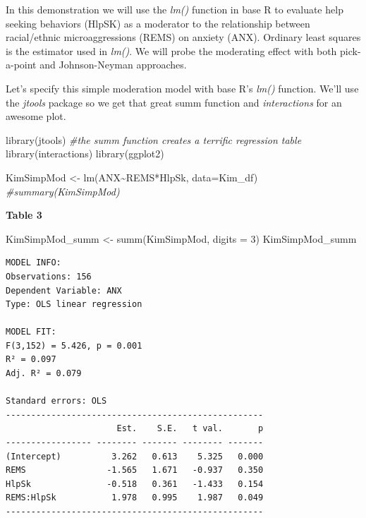 \documentclass[
  11pt,
]{book}
\newenvironment{Shaded}{\begin{snugshade}}{\end{snugshade}}
\newcommand{\AttributeTok}[1]{\textcolor[rgb]{0.77,0.63,0.00}{#1}}
\newcommand{\CommentTok}[1]{\textcolor[rgb]{0.56,0.35,0.01}{\textit{#1}}}
\newcommand{\DecValTok}[1]{\textcolor[rgb]{0.00,0.00,0.81}{#1}}
\newcommand{\FunctionTok}[1]{\textcolor[rgb]{0.00,0.00,0.00}{#1}}
\newcommand{\NormalTok}[1]{#1}
\newcommand{\OtherTok}[1]{\textcolor[rgb]{0.56,0.35,0.01}{#1}}
\newcommand{\SpecialCharTok}[1]{\textcolor[rgb]{0.00,0.00,0.00}{#1}}
\begin{document}
In this demonstration we will use the \emph{lm()} function in base R to evaluate help seeking behaviors (HlpSK) as a moderator to the relationship between racial/ethnic microaggressions (REMS) on anxiety (ANX). Ordinary least squares is the estimator used in \emph{lm()}. We will probe the moderating effect with both pick-a-point and Johnson-Neyman approaches.

Let's specify this simple moderation model with base R's \emph{lm()} function. We'll use the \emph{jtools} package so we get that great summ function and \emph{interactions} for an awesome plot.

\begin{Shaded}
\begin{Highlighting}[]
\FunctionTok{library}\NormalTok{(jtools) }\CommentTok{\#the summ function creates a terrific regression table}
\FunctionTok{library}\NormalTok{(interactions)}
\FunctionTok{library}\NormalTok{(ggplot2)}

\NormalTok{KimSimpMod }\OtherTok{\textless{}{-}} \FunctionTok{lm}\NormalTok{(ANX}\SpecialCharTok{\textasciitilde{}}\NormalTok{REMS}\SpecialCharTok{*}\NormalTok{HlpSk, }\AttributeTok{data=}\NormalTok{Kim\_df)}
\CommentTok{\#summary(KimSimpMod)}
\end{Highlighting}
\end{Shaded}

\textbf{Table 3}

\begin{Shaded}
\begin{Highlighting}[]
\NormalTok{KimSimpMod\_summ }\OtherTok{\textless{}{-}} \FunctionTok{summ}\NormalTok{(KimSimpMod, }\AttributeTok{digits =} \DecValTok{3}\NormalTok{)}
\NormalTok{KimSimpMod\_summ}
\end{Highlighting}
\end{Shaded}

\begin{verbatim}
MODEL INFO:
Observations: 156
Dependent Variable: ANX
Type: OLS linear regression 

MODEL FIT:
F(3,152) = 5.426, p = 0.001
R² = 0.097
Adj. R² = 0.079 

Standard errors: OLS
---------------------------------------------------
                      Est.    S.E.   t val.       p
----------------- -------- ------- -------- -------
(Intercept)          3.262   0.613    5.325   0.000
REMS                -1.565   1.671   -0.937   0.350
HlpSk               -0.518   0.361   -1.433   0.154
REMS:HlpSk           1.978   0.995    1.987   0.049
---------------------------------------------------
\end{verbatim}
\end{document}
